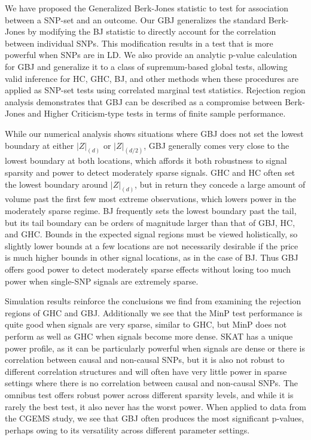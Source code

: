 \documentclass[12pt]{article}
\begin{document}
We have proposed the Generalized Berk-Jones statistic to test for association
between a SNP-set and an outcome. Our GBJ generalizes the standard
Berk-Jones by modifying the BJ statistic to directly account for the correlation between individual SNPs.
This modification results in a test that is more powerful when SNPs are in LD.
We also provide an analytic p-value calculation for GBJ and generalize it to a class
of supremum-based global tests, allowing valid inference for HC, GHC, BJ, and other 
methods when these procedures are applied as SNP-set tests using correlated marginal test statistics. 
Rejection region analysis demonstrates that GBJ can be described as
a compromise between Berk-Jones and Higher Criticism-type tests in terms of finite sample performance.

While our numerical analysis shows situations where GBJ does not set the lowest boundary at 
either $|Z|_{(d)}$ or  $|Z|_{(d/2)}$, GBJ generally comes very close to the lowest boundary at both locations, 
which affords it both robustness to signal sparsity and power to detect moderately sparse signals.
GHC and HC often set the lowest boundary around $|Z|_{(d)}$, but in return they concede a large amount of
volume past the first few most extreme observations, which lowers power in the moderately sparse regime.
BJ frequently sets the lowest boundary past the tail, but its tail boundary can be orders of magnitude larger than
that of GBJ, HC, and GHC.
Bounds in the expected signal regions must be viewed holistically, so slightly lower
bounds at a few locations are not necessarily desirable if the price is much higher bounds in other signal locations, as
in the case of BJ.
Thus GBJ offers good power to detect moderately sparse effects without losing too much 
power when single-SNP signals are extremely sparse.

Simulation results reinforce the conclusions we find from examining the rejection regions of 
GHC and GBJ. 
Additionally we see that the MinP test performance is quite good when signals are very sparse,
similar to GHC, but MinP does not perform as well as GHC when signals become more dense.
SKAT has a unique power profile, as it can be particularly powerful when signals 
are dense or there is correlation between causal and non-causal SNPs,
 but it is also not robust to different correlation structures and will often have very 
little power in sparse settings where there is no correlation between causal and non-causal SNPs.
The omnibus test offers robust power across different sparsity levels, 
and while it is rarely the best test, it also never has the worst power.
When applied to data from the CGEMS study, we see that GBJ often produces the most 
significant p-values, perhaps owing to its versatility across different parameter settings. 
\end{document}
